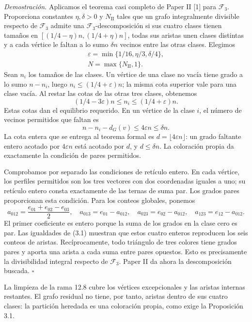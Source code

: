 \documentclass[spanish,11pt,a4paper]{article}
\begin{document}
\emph{Demostración.} Aplicamos el teorema casi completo de Paper II {[}1{]} para \(\mathcal F_3\). Proporciona constantes \(\eta,\delta>0\) y \(N_{\mathrm{II}}\) tales que un grafo integralmente divisible respecto de \(\mathcal F_3\) admite una \(\mathcal F_3\)-descomposición si sus cuatro clases tienen tamaños en \([(1/4-\eta)n,(1/4+\eta)n]\), todas sus aristas unen clases distintas y a cada vértice le faltan a lo sumo \(\delta n\) vecinos entre las otras clases. Elegimos \[\begin{gathered}
\varepsilon=\min\{1/16,\eta/3,\delta/4\},\\
N=\max\{N_{\mathrm{II}},1\}.
\end{gathered}\] Sean \(n_i\) los tamaños de las clases. Un vértice de una clase no vacía tiene grado a lo sumo \(n-n_i\), luego \(n_i\le(1/4+\varepsilon)n\); la misma cota superior vale para una clase vacía. Al restar las cotas de las otras tres clases, obtenemos \[(1/4-3\varepsilon)n\le n_i\le(1/4+\varepsilon)n.\] Estas cotas dan el equilibrio requerido. En un vértice de la clase \(i\), el número de vecinos permitidos que faltan es \[n-n_i-d_G(v)\le4\varepsilon n\le\delta n.\] La cota entera que se entrega al teorema formal es \(d=\lfloor4\varepsilon n\rfloor\): un grado faltante entero acotado por \(4\varepsilon n\) está acotado por \(d\), y \(d\le\delta n\). La coloración propia da exactamente la condición de pares permitidos.

Comprobamos por separado las condiciones de retículo entero. En cada vértice, los perfiles permitidos son los tres vectores con dos coordenadas iguales a uno; su retículo entero consta exactamente de las ternas de suma par. Los grados pares proporcionan esta condición. Para los conteos globales, ponemos \[a_{012}=\frac{e_{01}+e_{02}-e_{03}}2,\quad
a_{013}=e_{01}-a_{012},\quad
a_{023}=e_{02}-a_{012},\quad
a_{123}=e_{12}-a_{012}.\] El primer coeficiente es entero porque la suma de los grados en la clase cero es par. Las igualdades de (3.1) muestran que estos cuatro enteros reproducen los seis conteos de aristas. Recíprocamente, todo triángulo de tres colores tiene grados pares y aporta una arista a cada suma entre pares opuestos. Esto es precisamente la divisibilidad integral respecto de \(\mathcal F_3\). Paper II da ahora la descomposición buscada. \(\square\)

La limpieza de la rama 12.8 cubre los vértices excepcionales y las aristas internas restantes. El grafo residual no tiene, por tanto, aristas dentro de sus cuatro clases: la partición heredada es una coloración propia, como exige la Proposición 3.1.
\end{document}
